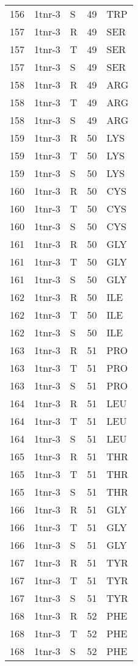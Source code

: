 \begin{tiny}
\begin{longtable}[l]{l|l|l|l|l}
	156 & 1tnr-3 & S & 49 & TRP \\
	157 & 1tnr-3 & R & 49 & SER \\
	157 & 1tnr-3 & T & 49 & SER \\
	157 & 1tnr-3 & S & 49 & SER \\
	158 & 1tnr-3 & R & 49 & ARG \\
	158 & 1tnr-3 & T & 49 & ARG \\
	158 & 1tnr-3 & S & 49 & ARG \\
	159 & 1tnr-3 & R & 50 & LYS \\
	159 & 1tnr-3 & T & 50 & LYS \\
	159 & 1tnr-3 & S & 50 & LYS \\
	160 & 1tnr-3 & R & 50 & CYS \\
	160 & 1tnr-3 & T & 50 & CYS \\
	160 & 1tnr-3 & S & 50 & CYS \\
	161 & 1tnr-3 & R & 50 & GLY \\
	161 & 1tnr-3 & T & 50 & GLY \\
	161 & 1tnr-3 & S & 50 & GLY \\
	162 & 1tnr-3 & R & 50 & ILE \\
	162 & 1tnr-3 & T & 50 & ILE \\
	162 & 1tnr-3 & S & 50 & ILE \\
	163 & 1tnr-3 & R & 51 & PRO \\
	163 & 1tnr-3 & T & 51 & PRO \\
	163 & 1tnr-3 & S & 51 & PRO \\
	164 & 1tnr-3 & R & 51 & LEU \\
	164 & 1tnr-3 & T & 51 & LEU \\
	164 & 1tnr-3 & S & 51 & LEU \\
	165 & 1tnr-3 & R & 51 & THR \\
	165 & 1tnr-3 & T & 51 & THR \\
	165 & 1tnr-3 & S & 51 & THR \\
	166 & 1tnr-3 & R & 51 & GLY \\
	166 & 1tnr-3 & T & 51 & GLY \\
	166 & 1tnr-3 & S & 51 & GLY \\
	167 & 1tnr-3 & R & 51 & TYR \\
	167 & 1tnr-3 & T & 51 & TYR \\
	167 & 1tnr-3 & S & 51 & TYR \\
	168 & 1tnr-3 & R & 52 & PHE \\
	168 & 1tnr-3 & T & 52 & PHE \\
	168 & 1tnr-3 & S & 52 & PHE \\

\end{longtable}
\end{tiny}
